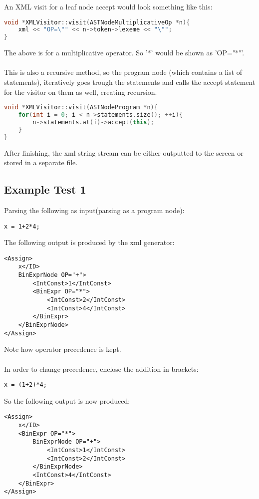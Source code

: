 An XML visit for a leaf node accept would look something like this:
\begin{lstlisting}[language=C++]
void *XMLVisitor::visit(ASTNodeMultiplicativeOp *n){
	xml << "OP=\"" << n->token->lexeme << "\"";
}
\end{lstlisting}
The above is for a multiplicative operator. So '*' would be shown as 'OP="*"'.
\\\\
This is also a recursive method, so the program node (which contains a list of statements), iteratively goes trough the statements and calls the accept statement for the visitor on them as well, creating recursion.

\begin{lstlisting}[language=C++]
void *XMLVisitor::visit(ASTNodeProgram *n){
	for(int i = 0; i < n->statements.size(); ++i){
		n->statements.at(i)->accept(this);
	}
}
\end{lstlisting}

After finishing, the xml string stream can be either outputted to the screen or stored in a separate file.

\subsection{Example Test 1}
Parsing the following as input(parsing as a program node):
\begin{lstlisting}
x = 1+2*4;
\end{lstlisting}

The following output is produced by the xml generator:
\begin{lstlisting}
<Assign>
	x</ID>
	BinExprNode OP="+">
		<IntConst>1</IntConst>
		<BinExpr OP="*">
			<IntConst>2</IntConst>
			<IntConst>4</IntConst>
		</BinExpr>
	</BinExprNode>
</Assign>
\end{lstlisting}
Note how operator precedence is kept.
\\\\
In order to change precedence, enclose the addition in brackets:
\begin{lstlisting}
x = (1+2)*4;
\end{lstlisting}

So the following output is now produced:
\begin{lstlisting}
<Assign>
	x</ID>
	<BinExpr OP="*">
		BinExprNode OP="+">
			<IntConst>1</IntConst>
			<IntConst>2</IntConst>
		</BinExprNode>
		<IntConst>4</IntConst>
	</BinExpr>
</Assign>
\end{lstlisting}

